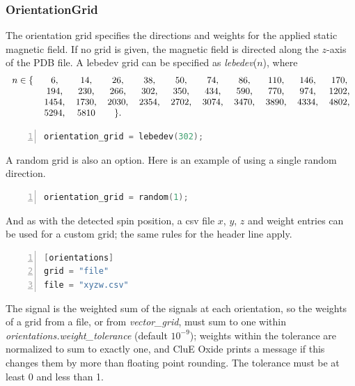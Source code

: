 \documentclass{book}
\begin{document}
\subsubsection{OrientationGrid} %
The orientation grid specifies the directions and weights for the applied 
static magnetic field.  If no grid is given, the magnetic field is directed 
along the $z$-axis of the PDB file.
A lebedev grid \cite{1999_Lebedev} can be specified as \textit{lebedev}($n$),
where  
\begin{equation}
\begin{tabular}{c c c c c c c c c c c}
$n \in \{$
  & 6, &  14, &  26, &  38, &  50, &  
  74, &  86, & 110, & 146, & 170,  
\\
& 194, & 230, & 266, & 302, & 350, & 
434, & 590, & 770, & 974, &1202, 
\\
& 1454, &1730, &2030, & 2354, & 2702, &
3074, &3470, &3890, & 4334, & 4802, 
\\
& 5294,& 5810 & $\}$. & & & & & & &  
\end{tabular}
\end{equation}
\begin{lstlisting}[frame=single,numbers=left,language=c]
orientation_grid = lebedev(302);
\end{lstlisting}
A random grid is also an option.  Here is an example of using a single random
direction. 
\begin{lstlisting}[frame=single,numbers=left,language=c]
orientation_grid = random(1);
\end{lstlisting}
And as with the detected spin position, a csv file $x$, $y$, $z$ and weight
entries can be used for a custom grid; the same rules for the header line 
apply.
\begin{lstlisting}[frame=single,numbers=left,language=c]
[orientations]
grid = "file"
file = "xyzw.csv"
\end{lstlisting}
The signal is the weighted sum of the signals at each orientation, so the 
weights of a grid from a file, or from \textit{vector\_grid}, must sum to one
within \textit{orientations.weight\_tolerance} (default $10^{-9}$); weights 
within the tolerance are normalized to sum to exactly one, and CluE Oxide 
prints a message if this changes them by more than floating point rounding.
The tolerance must be at least 0 and less than 1.
\end{document}
